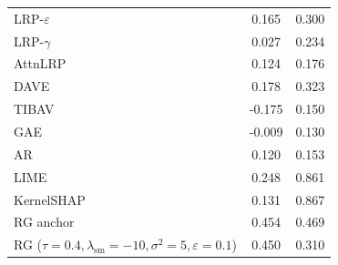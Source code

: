 \begin{tabular}{l c c}
LRP-$\varepsilon$ & 0.165 & 0.300 \\
LRP-$\gamma$ & 0.027 & 0.234 \\
AttnLRP & 0.124 & 0.176 \\
DAVE & 0.178 & 0.323 \\
TIBAV & -0.175 & 0.150 \\
GAE & -0.009 & 0.130 \\
AR & 0.120 & 0.153 \\
LIME & 0.248 & 0.861 \\
KernelSHAP & 0.131 & 0.867 \\
RG anchor & 0.454 & 0.469 \\
RG ($\tau{=}0.4,\lambda_{\mathrm{sm}}{=}{-}10,\sigma^2{=}5,\varepsilon{=}0.1$) & 0.450 & 0.310 \\
\bottomrule
\end{tabular}
